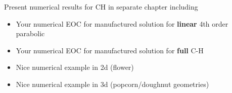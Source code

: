 Present numerical results for CH in separate chapter including
\begin{itemize}
    \item Your numerical EOC for  manufactured solution for \textbf{linear} 4th order parabolic
    \item Your numerical EOC for  manufactured solution for \textbf{full} C-H
    \item Nice numerical example in 2d (flower)
    \item Nice numerical example in 3d (popcorn/doughnut geometries)
\end{itemize}


